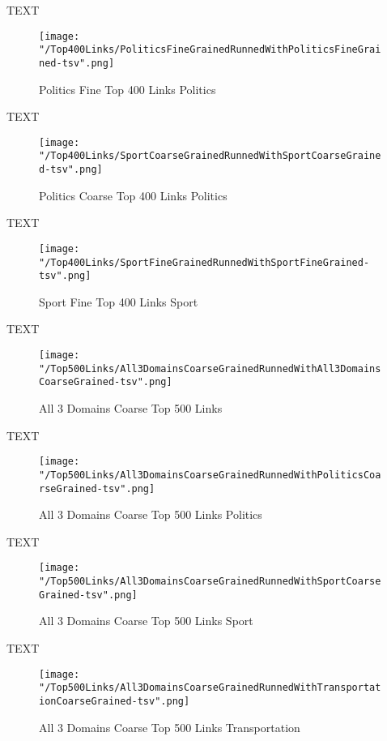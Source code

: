 \documentclass[thesis=M,english]{FITthesis}[2012/10/20]
\begin{document}
	TEXT	

	\begin{figure}\centering
		\texttt{[image: "/Top400Links/PoliticsFineGrainedRunnedWithPoliticsFineGrained-tsv".png]}
		\caption{Politics Fine Top 400 Links Politics}\label{}
	\end{figure}

	
	TEXT

	\begin{figure}\centering
		\texttt{[image: "/Top400Links/SportCoarseGrainedRunnedWithSportCoarseGrained-tsv".png]}
		\caption{Politics Coarse Top 400 Links Politics}\label{}
	\end{figure}		
	
		TEXT	

	\begin{figure}\centering
		\texttt{[image: "/Top400Links/SportFineGrainedRunnedWithSportFineGrained-tsv".png]}
		\caption{Sport Fine Top 400 Links Sport}\label{}	
	\end{figure}

	TEXT

	\begin{figure}\centering
		\texttt{[image: "/Top500Links/All3DomainsCoarseGrainedRunnedWithAll3DomainsCoarseGrained-tsv".png]}
		\caption{All 3 Domains Coarse Top 500 Links}\label{}
	\end{figure}

	TEXT

	\begin{figure}\centering
		\texttt{[image: "/Top500Links/All3DomainsCoarseGrainedRunnedWithPoliticsCoarseGrained-tsv".png]}
		\caption{All 3 Domains Coarse Top 500 Links Politics}\label{}
	\end{figure}	

	TEXT	

	\begin{figure}\centering
		\texttt{[image: "/Top500Links/All3DomainsCoarseGrainedRunnedWithSportCoarseGrained-tsv".png]}
		\caption{All 3 Domains Coarse Top 500 Links Sport}\label{}
	\end{figure}
	
		TEXT	

	\begin{figure}\centering
		\texttt{[image: "/Top500Links/All3DomainsCoarseGrainedRunnedWithTransportationCoarseGrained-tsv".png]}
		\caption{All 3 Domains Coarse Top 500 Links Transportation}\label{}	
	\end{figure}
		
\end{document}
